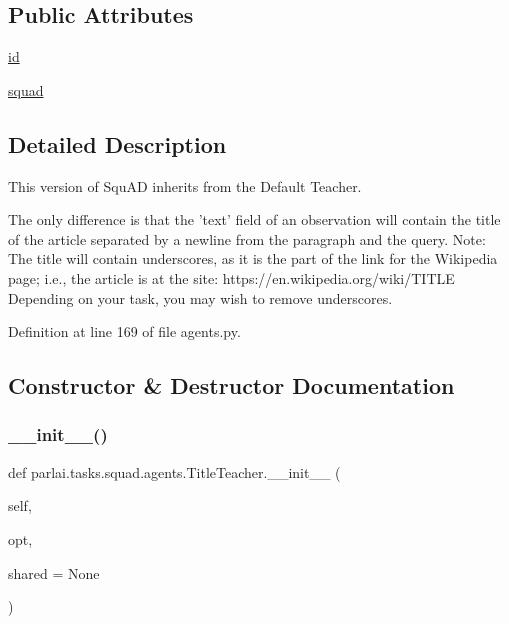 \subsection*{Public Attributes}
\begin{DoxyCompactItemize}
\item 
\hyperlink{classparlai_1_1tasks_1_1squad_1_1agents_1_1TitleTeacher_afc29efc5cf9c9800f0cb5d9346b48f61}{id}
\item 
\hyperlink{classparlai_1_1tasks_1_1squad_1_1agents_1_1TitleTeacher_a416d2c1d7eb4e93ba1dc213cba6d2d26}{squad}
\end{DoxyCompactItemize}


\subsection{Detailed Description}
\begin{DoxyVerb}This version of SquAD inherits from the Default Teacher.

The only
difference is that the 'text' field of an observation will contain
the title of the article separated by a newline from the paragraph and the
query.
Note: The title will contain underscores, as it is the part of the link for
the Wikipedia page; i.e., the article is at the site:
https://en.wikipedia.org/wiki/{TITLE}
Depending on your task, you may wish to remove underscores.
\end{DoxyVerb}
 

Definition at line 169 of file agents.\+py.



\subsection{Constructor \& Destructor Documentation}
\mbox{\label{classparlai_1_1tasks_1_1squad_1_1agents_1_1TitleTeacher_a3d00faef86db6eb5b783b4aba4216daa}} 
\subsubsection{\texorpdfstring{\+\_\+\+\_\+init\+\_\+\+\_\+()}{\_\_init\_\_()}}
{\footnotesize\ttfamily def parlai.\+tasks.\+squad.\+agents.\+Title\+Teacher.\+\_\+\+\_\+init\+\_\+\+\_\+ (\begin{DoxyParamCaption}\item[{}]{self,  }\item[{}]{opt,  }\item[{}]{shared = {\ttfamily None} }\end{DoxyParamCaption})}



